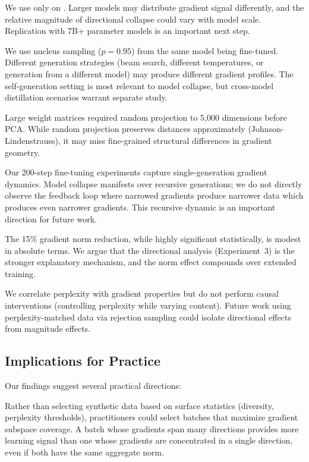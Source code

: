  We use only \gptsmall on \wikitext. Larger models may distribute gradient signal differently, and the relative magnitude of directional collapse could vary with model scale. Replication with 7B+ parameter models is an important next step.

 We use nucleus sampling ($p = 0.95$) from the same model being fine-tuned. Different generation strategies (beam search, different temperatures, or generation from a different model) may produce different gradient profiles. The self-generation setting is most relevant to model collapse, but cross-model distillation scenarios warrant separate study.

 Large weight matrices required random projection to 5{,}000 dimensions before PCA. While random projection preserves distances approximately (Johnson-Lindenstrauss), it may miss fine-grained structural differences in gradient geometry.

 Our 200-step fine-tuning experiments capture single-generation gradient dynamics. Model collapse manifests over recursive generations; we do not directly observe the feedback loop where narrowed gradients produce narrower data which produces even narrower gradients. This recursive dynamic is an important direction for future work.

 The 15\% gradient norm reduction, while highly significant statistically, is modest in absolute terms. We argue that the directional analysis (Experiment~3) is the stronger explanatory mechanism, and the norm effect compounds over extended training.

 We correlate perplexity with gradient properties but do not perform causal interventions (\eg controlling perplexity while varying content). Future work using perplexity-matched data via rejection sampling could isolate directional effects from magnitude effects.

\subsection{Implications for Practice}

Our findings suggest several practical directions:

 Rather than selecting synthetic data based on surface statistics (diversity, perplexity thresholds), practitioners could select batches that maximize gradient subspace coverage. A batch whose gradients span many directions provides more learning signal than one whose gradients are concentrated in a single direction, even if both have the same aggregate norm.

